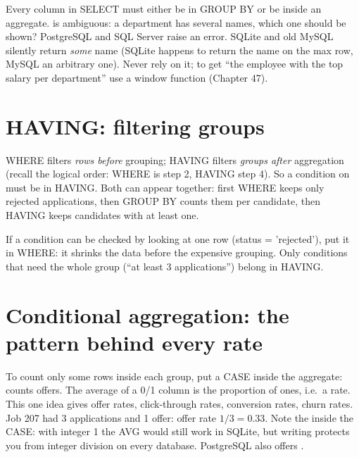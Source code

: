 \begin{trap}
Every column in SELECT must either be in GROUP BY or be inside an aggregate.  is
ambiguous: a department has several names, which one should be shown? PostgreSQL and SQL Server raise an error. SQLite and old MySQL silently return
\emph{some} name (SQLite happens to return the name on the max row, MySQL an arbitrary one). Never rely on it; to get ``the employee with the top salary per
department'' use a window function (Chapter 47).
\end{trap}

\section{HAVING: filtering groups}
WHERE filters \emph{rows before} grouping; HAVING filters \emph{groups after} aggregation (recall the logical order: WHERE is step 2, HAVING step 4). So a
condition on  must be in HAVING.
Both can appear together: first WHERE keeps only rejected applications, then GROUP BY counts them per candidate, then HAVING keeps candidates with at
least one.
\begin{intuition}
If a condition can be checked by looking at one row (status = 'rejected'), put it in WHERE: it shrinks the data before the expensive grouping. Only
conditions that need the whole group (``at least 3 applications'') belong in HAVING.
\end{intuition}

\section{Conditional aggregation: the pattern behind every rate}
To count only some rows inside each group, put a CASE inside the aggregate:  counts offers. The
average of a 0/1 column is the proportion of ones, i.e.\ a rate. This one idea gives offer rates, click-through rates, conversion rates, churn rates.
Job 207 had 3 applications and 1 offer: offer rate $1/3 = 0.33$. Note the  inside the CASE: with integer 1 the AVG would still work in SQLite,
but writing  protects you from integer division on every database. PostgreSQL also offers .

